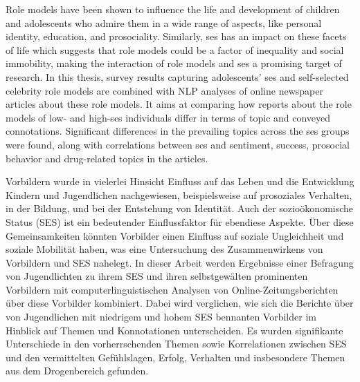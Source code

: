 Role models have been shown to influence the life and development of children and adolescents who admire them in a wide range of aspects, like personal identity, education, and prosociality. Similarly, \gls{ses} has an impact on these facets of life which suggests that role models could be a factor of inequality and social immobility, making the interaction of role models and \gls{ses} a promising target of research. In this thesis, survey results capturing adolescents' \gls{ses} and self-selected celebrity role models are combined with NLP analyses of online newspaper articles about these role models. It aims at comparing how reports about the role models of low- and high-\gls{ses} individuals differ in terms of topic and conveyed connotations. Significant differences in the prevailing topics across the \gls{ses} groups were found, along with correlations between \gls{ses} and sentiment, success, prosocial behavior and drug-related topics in the articles.

\vspace{2cm}
Vorbildern wurde in vielerlei Hinsicht Einfluss auf das Leben und die Entwicklung Kindern und Jugendlichen nachgewiesen, beispielsweise auf prosoziales Verhalten, in der Bildung, und bei der Entstehung von Identität. Auch der sozioökonomische Status (SES) ist ein bedeutender Einflussfaktor für ebendiese Aspekte. Über diese Gemeinsamkeiten könnten Vorbilder einen Einfluss auf soziale Ungleichheit und soziale Mobilität haben, was eine Untersuchung des Zusammenwirkens von Vorbildern und SES nahelegt. In dieser Arbeit werden Ergebnisse einer Befragung von Jugendlichten zu ihrem SES und ihren selbstgewälten prominenten Vorbildern mit computerlinguistischen Analysen von Online-Zeitungsberichten über diese Vorbilder kombiniert. Dabei wird verglichen, wie sich die Berichte über von Jugendlichen mit niedrigem und hohem SES bennanten Vorbilder im Hinblick auf Themen und Konnotationen unterscheiden. Es wurden signifikante Unterschiede in den vorherrschenden Themen sowie Korrelationen zwischen SES und den vermittelten Gefühlslagen, Erfolg, Verhalten und insbesondere Themen aus dem Drogenbereich gefunden.

\glsresetall